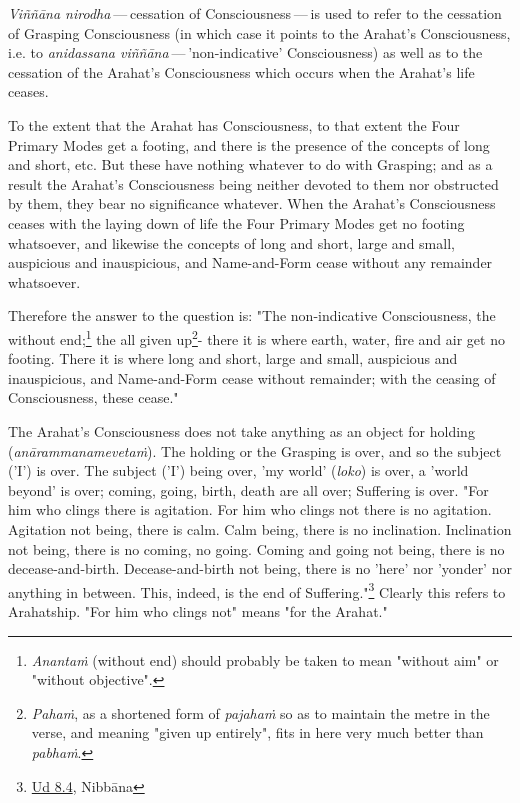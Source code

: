 \emph{Viññāna nirodha} --- cessation of Consciousness --- is used to refer to the cessation of Grasping Consciousness (in which case it points to the Arahat's Consciousness, i.e. to \emph{anidassana viññāna} --- 'non-indicative' Consciousness) as well as to the cessation of the Arahat's Consciousness which occurs when the Arahat's life ceases.

To the extent that the Arahat has Consciousness, to that extent the Four Primary Modes get a footing, and there is the presence of the concepts of long and short, etc. But these have nothing whatever to do with Grasping; and as a result the Arahat's Consciousness being neither devoted to them nor obstructed by them, they bear no significance whatever. When the Arahat's Consciousness ceases with the laying down of life the Four Primary Modes get no footing whatsoever, and likewise the concepts of long and short, large and small, auspicious and inauspicious, and Name-and-Form cease without any remainder whatsoever.

Therefore the answer to the question is: "The non-indicative Consciousness, the without end;\footnote{\emph{Anantaṁ} (without end) should probably be taken to mean "without aim" or "without objective".} the all given up\footnote{\emph{Pahaṁ}, as a shortened form of \emph{pajahaṁ} so as to maintain the metre in the verse, and meaning "given up entirely", fits in here very much better than \emph{pabhaṁ}.}- there it is where earth, water, fire and air get no footing. There it is where long and short, large and small, auspicious and inauspicious, and Name-and-Form cease without remainder; with the ceasing of Consciousness, these cease."

The Arahat's Consciousness does not take anything as an object for holding (\emph{anārammanamevetaṁ}). The holding or the Grasping is over, and so the subject ('I') is over. The subject ('I') being over, 'my world' (\emph{loko}) is over, a 'world beyond' is over; coming, going, birth, death are all over; Suffering is over. "For him who clings there is agitation. For him who clings not there is no agitation. Agitation not being, there is calm. Calm being, there is no inclination. Inclination not being, there is no coming, no going. Coming and going not being, there is no decease-and-birth. Decease-and-birth not being, there is no 'here' nor 'yonder' nor anything in between. This, indeed, is the end of Suffering."\footnote{\href{https://suttacentral.net/ud8.4/en/anandajoti}{Ud 8.4}, Nibbāna} Clearly this refers to Arahatship. "For him who clings not" means "for the Arahat."

